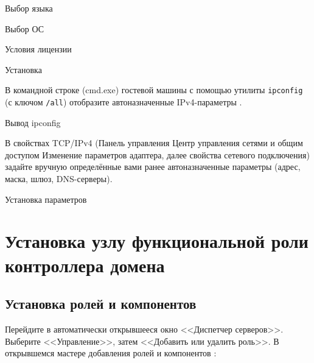 \begin{image}
	\caption{Выбор языка}
	\label{fig:ws:install:lang}
\end{image}

\begin{image}
	\caption{Выбор ОС}
	\label{fig:ws:install:os}
\end{image}

\begin{image}
	\caption{Условия лицензии}
	\label{fig:ws:install:license}
\end{image}

\begin{image}
	\caption{Установка}
	\label{fig:ws:install}
\end{image}

В командной строке (cmd.exe) гостевой машины
с помощью утилиты \texttt{ipconfig} (с ключом \texttt{/all})
отобразите автоназначенные IPv4-параметры .

\begin{image}
	\caption{Вывод ipconfig}
	\label{fig:ipconfig}
\end{image}

В свойствах TCP/IPv4
(Панель управления \rarrow Центр управления сетями и общим доступом
\rarrow Изменение параметров адаптера, далее свойства сетевого подключения)
задайте вручную определённые вами ранее автоназначенные параметры
(адрес, маска, шлюз, DNS-серверы).

\begin{image}
	\caption{Установка параметров}
	\label{fig:set:adapter}
\end{image}

\section{Установка узлу функциональной роли контроллера домена}

\subsection{Установка ролей и компонентов}

Перейдите в автоматически открывшееся окно <<Диспетчер серверов>>.
Выберите <<Управление>>, затем <<Добавить или удалить роль>>.
В открывшемся мастере добавления ролей и компонентов
:

